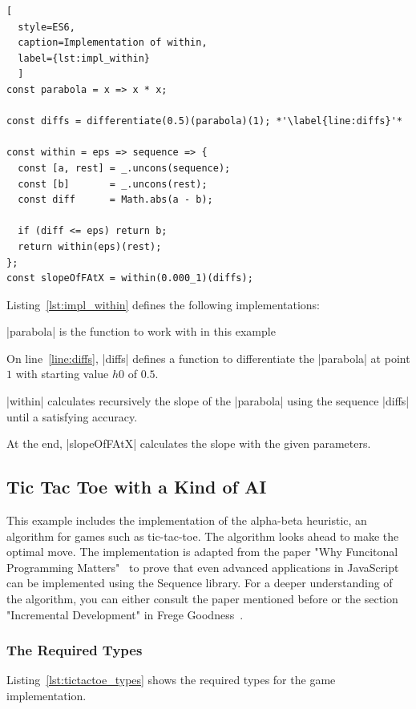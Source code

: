 \begin{lstlisting}[
  style=ES6, 
  caption=Implementation of within,
  label={lst:impl_within}
  ]
const parabola = x => x * x;

const diffs = differentiate(0.5)(parabola)(1); *'\label{line:diffs}'*

const within = eps => sequence => {
  const [a, rest] = _.uncons(sequence);
  const [b]       = _.uncons(rest);
  const diff      = Math.abs(a - b);

  if (diff <= eps) return b;
  return within(eps)(rest);
};
const slopeOfFAtX = within(0.000_1)(diffs);
\end{lstlisting}

Listing~\ref{lst:impl_within} defines the following implementations:

\begin{itemize}
  \item{|parabola| is the function to work with in this example}
  \item{On line~\ref{line:diffs}, |diffs| defines a function to differentiate the |parabola| at point $1$ with
    starting value $h0$ of $0.5$.}
  \item{|within| calculates recursively the slope of the |parabola| using the
      sequence |diffs| until a satisfying accuracy. 
    \item{ At the end, |slopeOfFAtX| calculates the slope with the given parameters. }
    }
\end{itemize}


\subsection{Tic Tac Toe with a Kind of AI}
\label{Alpha - Beta Algorithm}
This example includes the implementation of the alpha-beta heuristic, an
algorithm for games such as tic-tac-toe. The algorithm looks ahead to make the
optimal move. The implementation is adapted from the paper "Why Funcitonal
Programming Matters"~\cite{hughes_why_1989} to prove that even advanced 
applications in JavaScript can
be implemented using the Sequence library. For a deeper understanding of the
algorithm, you can either consult the paper mentioned before or the section
"Incremental Development" in Frege Goodness~\cite{frege_goodness}.

\subsubsection{The Required Types}
\label{subsub:The Required Types}
Listing~\ref{lst:tictactoe_types} shows the required types for the game
implementation.


